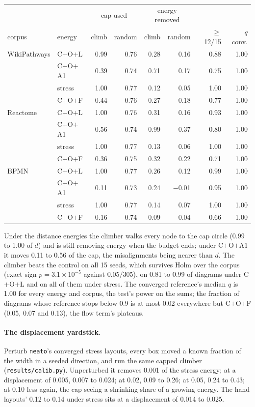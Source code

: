 \documentclass[a4paper,UKenglish]{gd-lipics-v3}
\begin{document}
\begin{center}\footnotesize
\begin{tabular}{llrrrrrr}
\toprule
 & & \multicolumn{2}{c}{cap used} & \multicolumn{2}{c}{energy removed} & & \\
corpus & energy & climb & random & climb & random & $\ge$12/15 & $q$ conv. \\
\midrule
WikiPathways & C$+$O$+$L & 0.99 & 0.76 & 0.28 & 0.16 & 0.88 & 1.00 \\
 & C$+$O$+$A1 & 0.39 & 0.74 & 0.71 & 0.17 & 0.75 & 1.00 \\
 & stress & 1.00 & 0.77 & 0.12 & 0.05 & 1.00 & 1.00 \\
 & C$+$O$+$F & 0.44 & 0.76 & 0.27 & 0.18 & 0.77 & 1.00 \\
\midrule
Reactome & C$+$O$+$L & 1.00 & 0.76 & 0.31 & 0.16 & 0.93 & 1.00 \\
 & C$+$O$+$A1 & 0.56 & 0.74 & 0.99 & 0.37 & 0.80 & 1.00 \\
 & stress & 1.00 & 0.77 & 0.13 & 0.06 & 1.00 & 1.00 \\
 & C$+$O$+$F & 0.36 & 0.75 & 0.32 & 0.22 & 0.71 & 1.00 \\
\midrule
BPMN & C$+$O$+$L & 1.00 & 0.77 & 0.26 & 0.12 & 0.99 & 1.00 \\
 & C$+$O$+$A1 & 0.11 & 0.73 & 0.24 & $-$0.01 & 0.95 & 1.00 \\
 & stress & 1.00 & 0.77 & 0.14 & 0.07 & 1.00 & 1.00 \\
 & C$+$O$+$F & 0.16 & 0.74 & 0.09 & 0.04 & 0.66 & 1.00 \\
\bottomrule
\end{tabular}
\end{center}

Under the distance energies the climber walks every node to the cap circle (0.99 to 1.00 of
$d$) and is still removing energy when the budget ends; under C$+$O$+$A1 it moves 0.11 to
0.56 of the cap, the misalignments being nearer than $d$. The climber beats the control on
all 15 seeds, which survives Holm over the corpus (exact sign $p = 3.1 \times 10^{-5}$
against $0.05/305$), on 0.81 to 0.99 of diagrams under C$+$O$+$L and on all of them under
stress. The converged reference's median $q$ is 1.00 for every energy and corpus, the
test's power on the sums; the fraction of diagrams whose reference stops below 0.9 is at
most 0.02 everywhere but C$+$O$+$F (0.05, 0.07 and 0.13), the flow term's plateaus.

\paragraph{The displacement yardstick.} Perturb \texttt{neato}'s converged stress
layouts, every box moved a known fraction of the width in a seeded direction, and run
the same capped climber (\texttt{results/calib.py}). Unperturbed it removes 0.001 of the
stress energy; at a displacement of 0.005, 0.007 to 0.024; at 0.02, 0.09 to 0.26; at
0.05, 0.24 to 0.43; at 0.10 less again, the cap seeing a shrinking share of a growing
energy. The hand layouts' 0.12 to 0.14 under stress sits at a displacement of 0.014 to
0.025.
\end{document}
